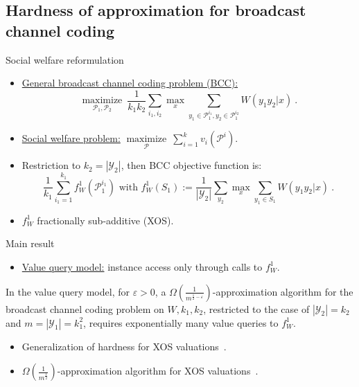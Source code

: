 \documentclass{beamer}
\theoremstyle{definition}
\theoremstyle{remark}
\DeclareMathOperator{\maxi}{\text{maximize}}
\begin{document}
\subsection{Hardness of approximation for broadcast channel coding}

\begin{frame}{Social welfare reformulation}
  \begin{itemize}
  \item \underline{General broadcast channel coding problem (\textsc{BCC}):}
    \[ \underset{\mathcal{P}_1,\mathcal{P}_2}{\maxi} \  \frac{1}{k_1k_2}\sum_{i_1,i_2} \max_x \sum_{y_1 \in \mathcal{P}_1^{i_1}, y_2 \in \mathcal{P}_1^{i_2}} W(y_1y_2|x) \ .\]

    \pause
    
  \item \underline{Social welfare problem:} $\underset{\mathcal{P}}{\maxi} \ \sum_{i=1}^k v_i\left(\mathcal{P}^i\right)$.

    \pause

  \item Restriction to $k_2=|\mathcal{Y}_2|$, then BCC objective function is:
    \[ \frac{1}{k_1}\sum_{i_1=1}^{k_1} f_W^1(\mathcal{P}_1^{i_1}) \text{ with } f_W^1(S_1) := \frac{1}{|\mathcal{Y}_2|}\sum_{y_2} \max_x \sum_{y_1 \in S_1} W(y_1y_2|x)\ .\]

    \pause

  \item $f_W^1$ fractionally sub-additive (XOS).
  \end{itemize}
\end{frame}

\begin{frame}{Main result}
  \begin{itemize}
  \item \underline{Value query model:} instance access only through calls to $f_W^1$.
  \end{itemize}

  \pause
  
  \begin{theorem}
  In the value query model, for $\varepsilon > 0$, a $\Omega\left(\frac{1}{m^{\frac{1}{2}-\varepsilon}}\right)$-approximation algorithm for the broadcast channel coding problem on $W,k_1,k_2$, restricted to the case of $|\mathcal{Y}_2| = k_2$ and $m = |\mathcal{Y}_1| = k_1^2$, requires exponentially many value queries to $f_W^1$.
  \end{theorem}

  \pause
  \bigskip
  
  \begin{itemize}
  \item Generalization of hardness for XOS valuations~\cite{MSV08}.
  \item $\Omega\left(\frac{1}{m^{\frac{1}{2}}}\right)$-approximation algorithm for XOS valuations~\cite{DS06}.
  \end{itemize}
\end{frame}
\end{document}
